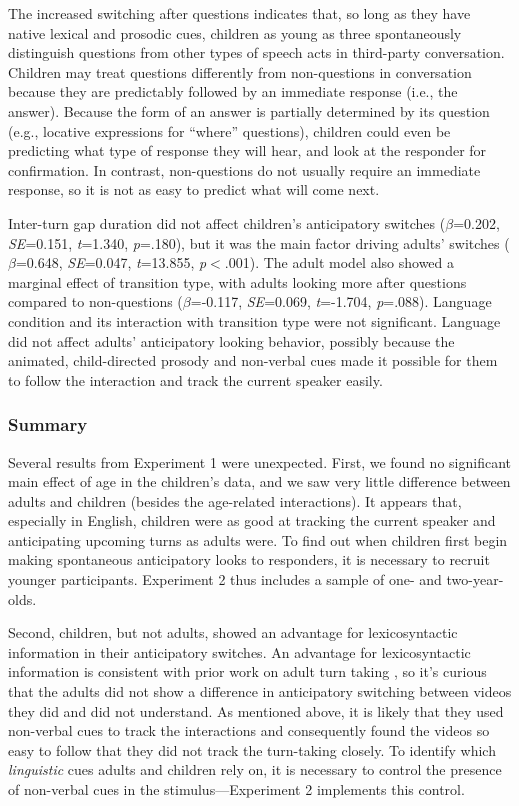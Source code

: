 \documentclass[authoryear, 12pt]{elsarticle}
\begin{document}
The increased switching after questions indicates that, so long as they have native lexical and prosodic cues, children as young as three spontaneously distinguish questions from other types of speech acts in third-party conversation. Children may treat questions differently from non-questions in conversation because they are predictably followed by an immediate response (i.e., the answer). Because the form of an answer is partially determined by its question (e.g., locative expressions for ``where'' questions), children could even be predicting what type of response they will hear, and look at the responder for confirmation. In contrast, non-questions do not usually require an immediate response, so it is not as easy to predict what will come next.

Inter-turn gap duration did not affect children's anticipatory switches (\textit{$\beta$}=0.202, \textit{SE}=0.151, \textit{t}=1.340, \textit{p}=.180), but it was the main factor driving adults' switches (\textit{$\beta$}=0.648, \textit{SE}=0.047, \textit{t}=13.855, \textit{p}$<$.001). The adult model also showed a marginal effect of transition type, with adults looking more after questions compared to non-questions (\textit{$\beta$}=-0.117, \textit{SE}=0.069, \textit{t}=-1.704, \textit{p}=.088). Language condition and its interaction with transition type were not significant. Language did not affect adults' anticipatory looking behavior, possibly because the animated, child-directed prosody and non-verbal cues made it possible for them to follow the interaction and track the current speaker easily.

\subsubsection{Summary}

Several results from Experiment 1 were unexpected. First, we found no significant main effect of age in the children's data, and we saw very little difference between adults and children (besides the age-related interactions). It appears that, especially in English, children were as good at tracking the current speaker and anticipating upcoming turns as adults were. To find out when children first begin making spontaneous anticipatory looks to responders, it is necessary to recruit younger participants. Experiment 2 thus includes a sample of one- and two-year-olds. 

Second, children, but not adults, showed an advantage for lexicosyntactic information in their anticipatory switches. An advantage for lexicosyntactic information is consistent with prior work on adult turn taking \citep{de-ruiter2006}, so it's curious that the adults did not show a difference in anticipatory switching between videos they did and did not understand. As mentioned above, it is likely that they used non-verbal cues to track the interactions and consequently found the videos so easy to follow that they did not track the turn-taking closely. To identify which \textit{linguistic} cues adults and children rely on, it is necessary to control the presence of non-verbal cues in the stimulus---Experiment 2 implements this control.
\end{document}
